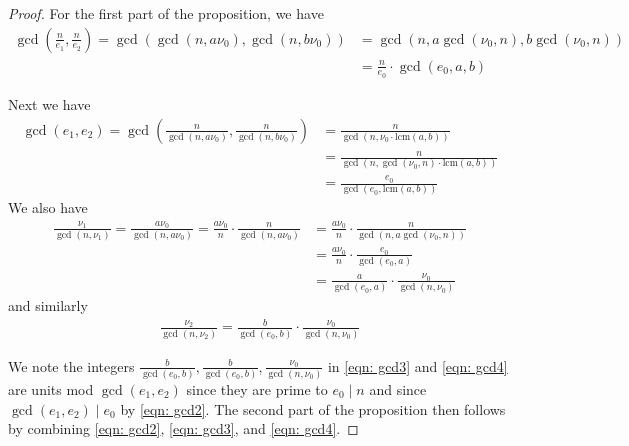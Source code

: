 \documentclass[12pt]{amsart}
\numberwithin{equation}{section}
\theoremstyle{definition}
\newcommand{\tx}[1]{\text{#1}}
\let\L\relax
\DeclareMathOperator{\L}{L}
\begin{document}
\begin{proof} For the first part of the proposition, we have
    \begin{equation*}
    \begin{aligned}
    \gcd(\frac{n}{e_1},\frac{n}{e_2})=\gcd(\gcd(n,a\nu_0),\gcd(n,b\nu_0))
    &=\gcd(n,a\gcd(\nu_0,n),b\gcd(\nu_0,n))
    \\&=\frac{n}{e_0}\cdot\gcd(e_0,a,b)
    \end{aligned}
    \end{equation*}
    
    Next we have
    \begin{equation}\label{eqn: gcd2}
    \begin{aligned}
        \gcd(e_1,e_2)=\gcd(\frac{n}{\gcd(n,a\nu_0)},\frac{n}{\gcd(n,b\nu_0)})&=\frac{n}{\gcd(n,\nu_0\cdot \tx{lcm}(a,b))}\\&=\frac{n}{\gcd(n,\gcd(\nu_0,n)\cdot \tx{lcm}(a,b))}\\&=\frac{e_0}{\gcd(e_0,\tx{lcm}(a,b))}
    \end{aligned}
    \end{equation}
    We also have
    \begin{equation}\label{eqn: gcd3}
    \begin{aligned}
    \frac{\nu_1}{\gcd(n,\nu_1)}=\frac{a\nu_0}{\gcd(n,a\nu_0)}=\frac{a\nu_0}{n}\cdot\frac{n}{\gcd(n,a\nu_0)}&=\frac{a\nu_0}{n}\cdot\frac{n}{\gcd(n,a\gcd(\nu_0,n))}\\
    &=\frac{a\nu_0}{n}\cdot\frac{e_0}{\gcd(e_0,a)}\\
    &=\frac{a}{\gcd(e_0,a)}\cdot\frac{\nu_0}{\gcd(n,\nu_0)}
    \end{aligned}
    \end{equation}
    and similarly
    \begin{equation}\label{eqn: gcd4}
    \begin{aligned}\frac{\nu_2}{\gcd(n,\nu_2)}=\frac{b}{\gcd(e_0,b)}\cdot\frac{\nu_0}{\gcd(n,\nu_0)}
    \end{aligned}
    \end{equation}
    
    We note the integers $\frac{b}{\gcd(e_0,b)},\frac{b}{\gcd(e_0,b)},\frac{\nu_0}{\gcd(n,\nu_0)}$ in \eqref{eqn: gcd3} and \eqref{eqn: gcd4} are units mod $\gcd(e_1,e_2)$ since they are prime to $e_0\mid n$ and since $\gcd(e_1,e_2)\mid e_0$ by \eqref{eqn: gcd2}. The second part of the proposition then follows by combining \eqref{eqn: gcd2}, \eqref{eqn: gcd3}, and \eqref{eqn: gcd4}. %
\end{proof}
\end{document}
